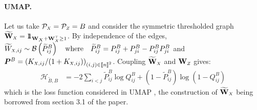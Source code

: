 \paragraph{UMAP.}
Let us take $\mathcal{P}_{\scaleto{X}{4pt}} = \mathcal{P}_{\scaleto{Z}{4pt}} = B$ and consider the symmetric thresholded graph $\widetilde{\Wb}_{\scaleto{X}{4pt}} = \ind_{\Wb_{\scaleto{X}{4pt}} + \Wb_X^\top \geq 1}$. By independence of the edges, $\widetilde{W}_{\scaleto{X}{4pt},ij} \sim \mathcal{B}\left(\widetilde{P}^{B}_{ij} \right) \quad \text{where} \quad  \widetilde{P}^{B}_{ij} = P^{B}_{ij} + P^{B}_{ji} - P^{B}_{ij} P^{B}_{ji}$ and $\bm{P}^{B} = \left( K_{\scaleto{X}{4pt},ij} / (1+K_{\scaleto{X}{4pt},ij}) \right)_{(i,j) \in \integ{n}^2}$. Coupling $\widetilde{\Wb}_{\scaleto{X}{4pt}}$ and $\Wb_{\scaleto{Z}{4pt}}$ gives:
\begin{align*}
    \mathcal{H}_{\widetilde{B},B} &= -2 \sum_{i<j} \widetilde{P}_{ij}^{B} \log Q_{ij}^{B} + \left(1 - \widetilde{P}_{ij}^{B} \right) \log \left( 1 - Q_{ij}^{B} \right)
\end{align*}
which is the loss function considered in UMAP \cite{mcinnes2018umap}, the construction of $\widetilde{\Wb}_{\scaleto{X}{4pt}}$ being borrowed from section 3.1 of the paper.



